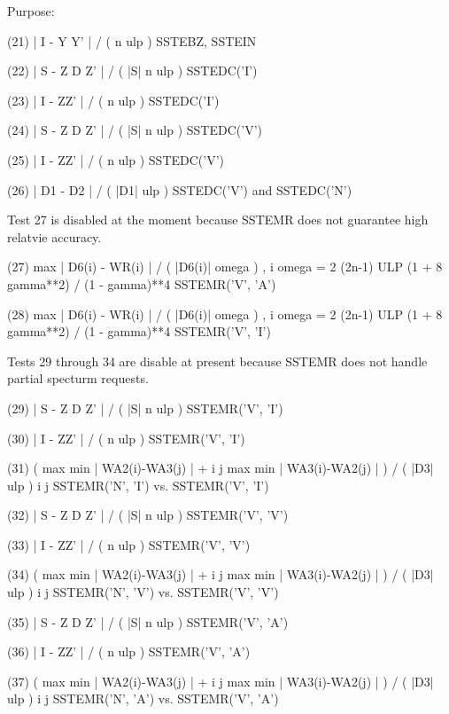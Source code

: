 \begin{DoxyParagraph}{Purpose\+: }
\begin{DoxyVerb}
 (21)    | I - Y Y' | / ( n ulp )          SSTEBZ, SSTEIN

 (22)    | S - Z D Z' | / ( |S| n ulp )    SSTEDC('I')

 (23)    | I - ZZ' | / ( n ulp )           SSTEDC('I')

 (24)    | S - Z D Z' | / ( |S| n ulp )    SSTEDC('V')

 (25)    | I - ZZ' | / ( n ulp )           SSTEDC('V')

 (26)    | D1 - D2 | / ( |D1| ulp )           SSTEDC('V') and
                                              SSTEDC('N')

 Test 27 is disabled at the moment because SSTEMR does not
 guarantee high relatvie accuracy.

 (27)    max | D6(i) - WR(i) | / ( |D6(i)| omega ) ,
          i
         omega = 2 (2n-1) ULP (1 + 8 gamma**2) / (1 - gamma)**4
                                              SSTEMR('V', 'A')

 (28)    max | D6(i) - WR(i) | / ( |D6(i)| omega ) ,
          i
         omega = 2 (2n-1) ULP (1 + 8 gamma**2) / (1 - gamma)**4
                                              SSTEMR('V', 'I')

 Tests 29 through 34 are disable at present because SSTEMR
 does not handle partial specturm requests.

 (29)    | S - Z D Z' | / ( |S| n ulp )    SSTEMR('V', 'I')

 (30)    | I - ZZ' | / ( n ulp )           SSTEMR('V', 'I')

 (31)    ( max { min | WA2(i)-WA3(j) | } +
            i     j
           max { min | WA3(i)-WA2(j) | } ) / ( |D3| ulp )
            i     j
         SSTEMR('N', 'I') vs. SSTEMR('V', 'I')

 (32)    | S - Z D Z' | / ( |S| n ulp )    SSTEMR('V', 'V')

 (33)    | I - ZZ' | / ( n ulp )           SSTEMR('V', 'V')

 (34)    ( max { min | WA2(i)-WA3(j) | } +
            i     j
           max { min | WA3(i)-WA2(j) | } ) / ( |D3| ulp )
            i     j
         SSTEMR('N', 'V') vs. SSTEMR('V', 'V')

 (35)    | S - Z D Z' | / ( |S| n ulp )    SSTEMR('V', 'A')

 (36)    | I - ZZ' | / ( n ulp )           SSTEMR('V', 'A')

 (37)    ( max { min | WA2(i)-WA3(j) | } +
            i     j
           max { min | WA3(i)-WA2(j) | } ) / ( |D3| ulp )
            i     j
         SSTEMR('N', 'A') vs. SSTEMR('V', 'A')


\end{DoxyVerb}
\end{DoxyParagraph}
